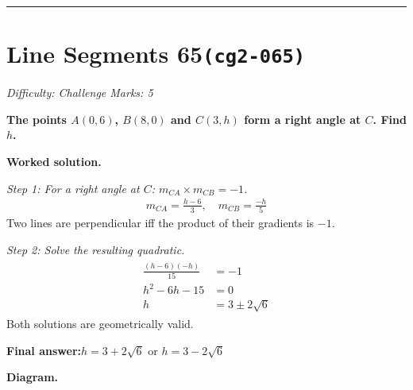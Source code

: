 \documentclass[11pt]{article}
\newcommand{\question}[1]{\par\medskip\noindent\textbf{#1}\par}
\begin{document}
\medskip\hrule

\section*{Line Segments 65\quad\small\texttt{(cg2-065)}}
\textit{Difficulty: Challenge \quad\textbar\quad Marks: 5}

\question{The points \( A(0, 6) \), \( B(8, 0) \) and \( C(3, h) \) form a right angle at \( C \). Find \( h \).}

\textbf{Worked solution.}

\textit{Step 1: For a right angle at \(C\): \(m_{CA} \times m_{CB} = -1\).}
\[\begin{gathered}
m_{CA} = \frac{h-6}{3}, \quad m_{CB} = \frac{-h}{5}
\end{gathered}\]
Two lines are perpendicular iff the product of their gradients is \(-1\).

\textit{Step 2: Solve the resulting quadratic.}
\[\begin{gathered}
\begin{aligned} \frac{(h-6)(-h)}{15} &= -1 \\ h^2 - 6h - 15 &= 0 \\ h &= 3 \pm 2\sqrt{6} \end{aligned}
\end{gathered}\]
Both solutions are geometrically valid.

\begin{answerbox}
\textbf{Final answer:}\quad \(\displaystyle h = 3 + 2\sqrt{6}\) or \(\displaystyle h = 3 - 2\sqrt{6}\)
\end{answerbox}
\textbf{Diagram.}
\end{document}
